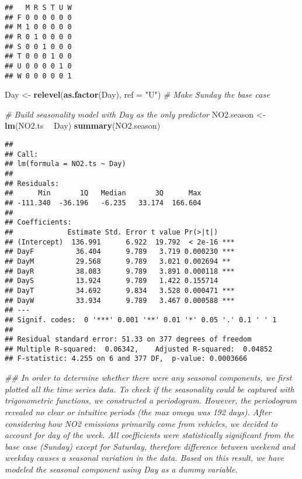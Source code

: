 \documentclass[
]{article}
\newenvironment{Shaded}{\begin{snugshade}}{\end{snugshade}}
\newcommand{\CommentTok}[1]{\textcolor[rgb]{0.56,0.35,0.01}{\textit{#1}}}
\newcommand{\DataTypeTok}[1]{\textcolor[rgb]{0.13,0.29,0.53}{#1}}
\newcommand{\KeywordTok}[1]{\textcolor[rgb]{0.13,0.29,0.53}{\textbf{#1}}}
\newcommand{\NormalTok}[1]{#1}
\newcommand{\OperatorTok}[1]{\textcolor[rgb]{0.81,0.36,0.00}{\textbf{#1}}}
\newcommand{\StringTok}[1]{\textcolor[rgb]{0.31,0.60,0.02}{#1}}
\begin{document}
\begin{verbatim}
##   M R S T U W
## F 0 0 0 0 0 0
## M 1 0 0 0 0 0
## R 0 1 0 0 0 0
## S 0 0 1 0 0 0
## T 0 0 0 1 0 0
## U 0 0 0 0 1 0
## W 0 0 0 0 0 1
\end{verbatim}

\begin{Shaded}
\begin{Highlighting}[]
\NormalTok{Day <-}\StringTok{ }\KeywordTok{relevel}\NormalTok{(}\KeywordTok{as.factor}\NormalTok{(Day), }\DataTypeTok{ref =} \StringTok{"U"}\NormalTok{) }\CommentTok{# Make Sunday the base case}

\CommentTok{# Build seasonality model with Day as the only predictor}
\NormalTok{NO2.season <-}\StringTok{ }\KeywordTok{lm}\NormalTok{(NO2.ts }\OperatorTok{~}\StringTok{ }\NormalTok{Day)}
\KeywordTok{summary}\NormalTok{(NO2.season)}
\end{Highlighting}
\end{Shaded}

\begin{verbatim}
## 
## Call:
## lm(formula = NO2.ts ~ Day)
## 
## Residuals:
##      Min       1Q   Median       3Q      Max 
## -111.340  -36.196   -6.235   33.174  166.604 
## 
## Coefficients:
##             Estimate Std. Error t value Pr(>|t|)    
## (Intercept)  136.991      6.922  19.792  < 2e-16 ***
## DayF          36.404      9.789   3.719 0.000230 ***
## DayM          29.568      9.789   3.021 0.002694 ** 
## DayR          38.083      9.789   3.891 0.000118 ***
## DayS          13.924      9.789   1.422 0.155714    
## DayT          34.692      9.834   3.528 0.000471 ***
## DayW          33.934      9.789   3.467 0.000588 ***
## ---
## Signif. codes:  0 '***' 0.001 '**' 0.01 '*' 0.05 '.' 0.1 ' ' 1
## 
## Residual standard error: 51.33 on 377 degrees of freedom
## Multiple R-squared:  0.06342,    Adjusted R-squared:  0.04852 
## F-statistic: 4.255 on 6 and 377 DF,  p-value: 0.0003666
\end{verbatim}

\begin{Shaded}
\begin{Highlighting}[]
\CommentTok{## In order to determine whether there were any seasonal components, we first plotted all the time series data. To check if the seasonality could be captured with trigonometric functions, we constructed a periodogram. However, the periodogram revealed no clear or intuitive periods (the max omega was 192 days). After considering how NO2 emissions primarily come from vehicles, we decided to account for day of the week. All coefficients were statistically significant from the base case (Sunday) except for Saturday, therefore difference between weekend and weekday causes a seasonal variation in the data. Based on this result, we have modeled the seasonal component using Day as a dummy variable.}
\end{Highlighting}
\end{Shaded}
\end{document}
